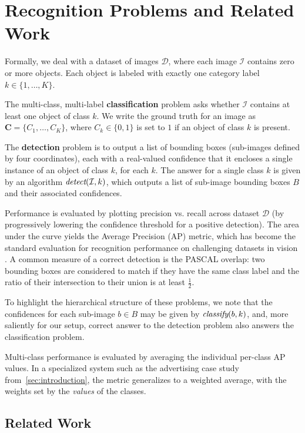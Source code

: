 \section{Recognition Problems and Related Work}

Formally, we deal with a dataset of images $\mathcal{D}$, where each image $\mathcal{I}$ contains zero or more objects.
Each object is labeled with exactly one category label $k \in \{1, \dots, K\}$.

The multi-class, multi-label \textbf{classification} problem asks whether $\mathcal{I}$ contains at least one object of class $k$.
We write the ground truth for an image as $\mathbf{C}=\{C_1,\dots,C_K\}$, where $C_k \in \{0,1\}$ is set to $1$ if an object of class $k$ is present.

The \textbf{detection} problem is to output a list of bounding boxes (sub-images defined by four coordinates), each with a real-valued confidence that it encloses a single instance of an object of class $k$, for each $k$.
The answer for a single class $k$ is given by an algorithm $\emph{detect}(\mathcal{I},k)$, which outputs a list of sub-image bounding boxes $B$ and their associated confidences.

Performance is evaluated by plotting precision vs. recall across dataset $\mathcal{D}$ (by progressively lowering the confidence threshold for a positive detection).
The area under the curve yields the Average Precision (AP) metric, which has become the standard evaluation for recognition performance on challenging datasets in vision \cite{pascal-voc-2010}.
A common measure of a correct detection is the PASCAL overlap: two bounding boxes are considered to match if they have the same class label and the ratio of their intersection to their union is at least $\frac{1}{2}$.

To highlight the hierarchical structure of these problems, we note that the confidences for each sub-image $b \in B$ may be given by $\emph{classify}(b,k)$, and, more saliently for our setup, correct answer to the detection problem also answers the classification problem.

Multi-class performance is evaluated by averaging the individual per-class AP values.
In a specialized system such as the advertising case study from~\autoref{sec:introduction}, the metric generalizes to a weighted average, with the weights set by the \emph{values} of the classes.

\subsection{Related Work}

